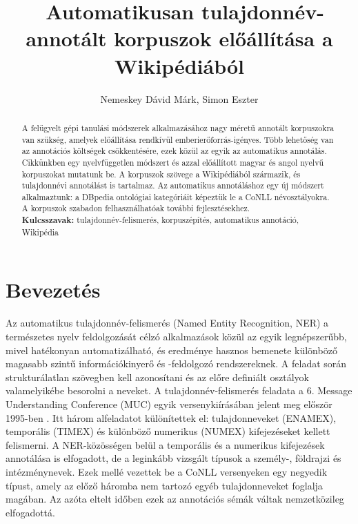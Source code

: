 \documentclass{llncs}
\begin{document}
\pagestyle{myheadings}
\def\leftmark{{\rm IX. Magyar Sz\'am\'\i t\'og\'epes Nyelv\'eszeti Konferencia}}
\def\rightmark{{\rm Szeged, 2013. január 7-8.}}

\setcounter{page}{3}

\title{\ \break Automatikusan tulajdonnév-annotált korpuszok előállítása a Wikipédiából}
\author{Nemeskey Dávid Márk, Simon Eszter}

\maketitle

\begin{abstract}
A felügyelt gépi tanulási módszerek alkalmazásához nagy méretű annotált korpuszokra van szükség, amelyek előállítása rendkívül emberierőforrás-igényes. Több lehetőség van az annotációs költségek csökkentésére, ezek közül az egyik az automatikus annotálás. Cikkünkben egy nyelvfüggetlen módszert és azzal előállított magyar és angol nyelvű korpuszokat mutatunk be. A korpuszok szövege a Wikipédiából származik, és tulajdonnévi annotálást is tartalmaz. Az automatikus annotáláshoz egy új módszert alkalmaztunk: a DBpedia ontológiai kategóriáit képeztük le a CoNLL névosztályokra. A korpuszok szabadon felhasználhatóak további fejlesztésekhez.
\\[2mm]
{\bf Kulcsszavak:} tulajdonnév-felismerés, korpuszépítés,
automatikus annotáció, Wikipédia
\end{abstract}

\section{Bevezet\'es}

Az automatikus tulajdonnév-felismerés (Named Entity Recognition, NER) a természetes nyelv feldolgozását célzó alkalmazások közül az egyik legnépszerűbb, mivel hatékonyan automatizálható, és eredménye hasznos bemenete különböző magasabb szintű információkinyerő és -feldolgozó rendszereknek. A feladat során strukturálatlan szövegben kell azonosítani és az előre definiált osztályok valamelyikébe besorolni a neveket. A tulajdonnév-felismerés feladata a 6. Message Understanding Conference (MUC) egyik versenykiírásában jelent meg először 1995-ben \cite{}. Itt három alfeladatot különítettek el: tulajdonneveket (ENAMEX), temporális (TIMEX) és különböző numerikus (NUMEX) kifejezéseket kellett felismerni. A NER-közösségen belül a temporális és a numerikus kifejezések annotálása is elfogadott, de a leginkább vizsgált típusok a személy-, földrajzi és intézménynevek. Ezek mellé vezettek be a CoNLL versenyeken \cite{} egy negyedik típust, amely az előző háromba nem tartozó egyéb tulajdonneveket foglalja magában. Az azóta eltelt időben ezek az annotációs sémák váltak nemzetközileg elfogadottá. 
\end{document}

